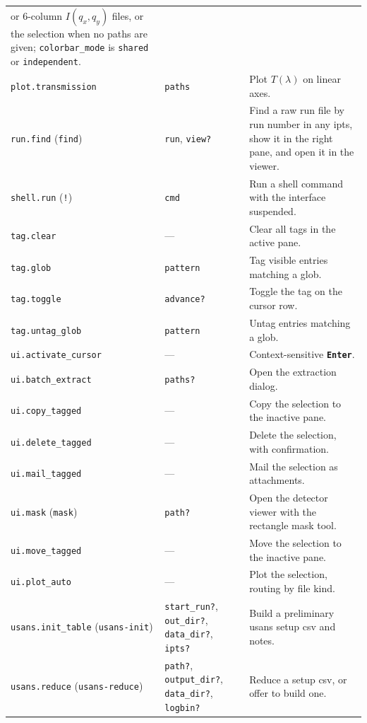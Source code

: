 \documentclass[tm]{ornltm}
\newcommand{\key}[1]{\textbf{\texttt{#1}}}
\begin{document}
\begin{small}
\begin{longtable}{p{} p{} p{}}
    or 6-column $I(q_x,q_y)$ files, or the selection when no paths are given;
    \texttt{colorbar\_mode} is \texttt{shared} or \texttt{independent}. \\
  \texttt{plot.transmission} & \texttt{paths} & Plot $T(\lambda)$ on linear
    axes. \\
  \texttt{run.find} (\texttt{find}) & \texttt{run}, \texttt{view?} & Find a
    raw run file by run number in any \ac{ipts}, show it in the right pane, and
    open it in the viewer. \\
  \texttt{shell.run} (\texttt{!}) & \texttt{cmd} & Run a shell command with the
    interface suspended. \\
  \texttt{tag.clear} & --- & Clear all tags in the active pane. \\
  \texttt{tag.glob} & \texttt{pattern} & Tag visible entries matching a
    glob. \\
  \texttt{tag.toggle} & \texttt{advance?} & Toggle the tag on the cursor
    row. \\
  \texttt{tag.untag\_glob} & \texttt{pattern} & Untag entries matching a
    glob. \\
  \texttt{ui.activate\_cursor} & --- & Context-sensitive \key{Enter}. \\
  \texttt{ui.batch\_extract} & \texttt{paths?} & Open the extraction dialog. \\
  \texttt{ui.copy\_tagged} & --- & Copy the selection to the inactive pane. \\
  \texttt{ui.delete\_tagged} & --- & Delete the selection, with
    confirmation. \\
  \texttt{ui.mail\_tagged} & --- & Mail the selection as attachments. \\
  \texttt{ui.mask} (\texttt{mask}) & \texttt{path?} & Open the detector viewer
    with the rectangle mask tool. \\
  \texttt{ui.move\_tagged} & --- & Move the selection to the inactive pane. \\
  \texttt{ui.plot\_auto} & --- & Plot the selection, routing by file kind. \\
  \texttt{usans.init\_table} (\texttt{usans-init}) & \texttt{start\_run?},
    \texttt{out\_dir?}, \texttt{data\_dir?}, \texttt{ipts?} & Build a
    preliminary \ac{usans} setup \ac{csv} and notes. \\
  \texttt{usans.reduce} (\texttt{usans-reduce}) & \texttt{path?},
    \texttt{output\_dir?}, \texttt{data\_dir?}, \texttt{logbin?} & Reduce a
    setup \ac{csv}, or offer to build one. \\

\end{longtable}
\end{small}
\end{document}
